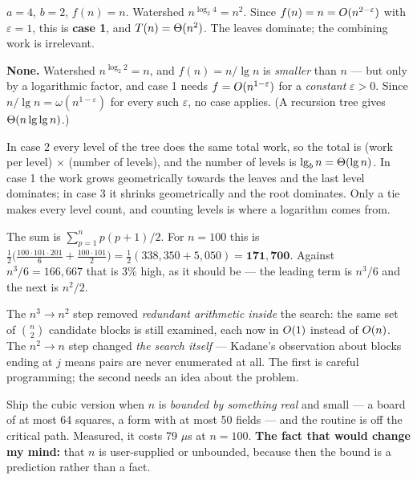 \begin{ans}
  \item $a = 4$, $b = 2$, $f(n) = n$. Watershed $n^{\log_{2}4} = n^{2}$. Since
        $f(n) = n = O(n^{2-\varepsilon})$ with $\varepsilon = 1$, this is
        \textbf{case 1}, and $T(n) = \Theta(n^{2})$. The leaves dominate; the
        combining work is irrelevant.
  \item \textbf{None.} Watershed $n^{\log_{2}2} = n$, and $f(n) = n/\lg n$ is
        \emph{smaller} than $n$ --- but only by a logarithmic factor, and case 1
        needs $f = O(n^{1-\varepsilon})$ for a \emph{constant}
        $\varepsilon > 0$. Since $n/\lg n = \omega(n^{1-\varepsilon})$ for
        every such $\varepsilon$, no case applies. (A recursion tree gives
        $\Theta(n \operatorname{lg}\operatorname{lg} n)$.)
  \item In case 2 every level of the tree does the same total work, so the
        total is (work per level) $\times$ (number of levels), and the number
        of levels is $\operatorname{lg}_{b} n = \Theta(\operatorname{lg} n)$. In case 1 the work grows
        geometrically towards the leaves and the last level dominates; in
        case 3 it shrinks geometrically and the root dominates. Only a tie
        makes every level count, and counting levels is where a logarithm comes
        from.
\end{ans}

\begin{ans}
  \item The sum is $\sum_{p=1}^{n} p(p+1)/2$. For $n = 100$ this is
        $\tfrac12\bigl(\tfrac{100\cdot101\cdot201}{6} + \tfrac{100\cdot101}{2}\bigr)
        = \tfrac12(338{,}350 + 5{,}050) = \mathbf{171{,}700}$. Against
        $n^{3}/6 = 166{,}667$ that is 3\% high, as it should be --- the
        leading term is $n^{3}/6$ and the next is $n^{2}/2$.
  \item The $n^{3} \to n^{2}$ step removed \emph{redundant arithmetic inside}
        the search: the same set of $\binom{n}{2}$ candidate blocks is still
        examined, each now in $O(1)$ instead of $O(n)$. The
        $n^{2} \to n$ step changed \emph{the search itself} --- Kadane's
        observation about blocks ending at $j$ means pairs are never enumerated
        at all. The first is careful programming; the second needs an idea
        about the problem.
  \item Ship the cubic version when $n$ is \emph{bounded by something real} and
        small --- a board of at most 64 squares, a form with at most 50 fields
        --- and the routine is off the critical path. Measured, it costs 79
        $\mu$s at $n = 100$. \textbf{The fact that would change my mind:} that
        $n$ is user-supplied or unbounded, because then the bound is a
        prediction rather than a fact.
\end{ans}

